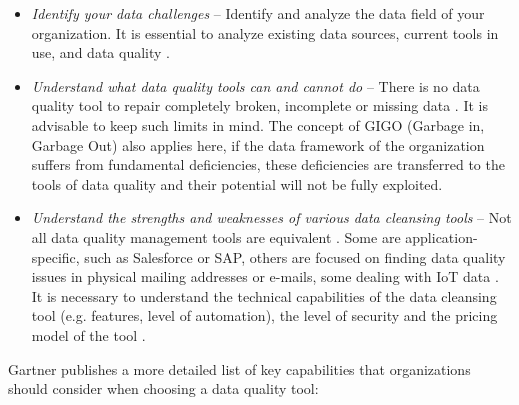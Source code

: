 			\begin{itemize}
				\item \textit{Identify your data challenges} -- Identify and analyze the data field of your organization. It is essential to analyze existing data sources, current tools in use, and data quality \cite{Greengard2019}.
				\item \textit{Understand what data quality tools can and cannot do} -- There is no data quality tool to repair completely broken, incomplete or missing data \cite{Greengard2019}. It is advisable to keep such limits in mind. The concept of GIGO (Garbage in, Garbage Out) also applies here, if the data framework of the organization suffers from fundamental deficiencies, these deficiencies are transferred to the tools of data quality and their potential will not be fully exploited.
				\item \textit{Understand the strengths and weaknesses of various data cleansing tools} -- Not all data quality management tools are equivalent \cite{Greengard2019}. Some are application-specific, such as Salesforce or SAP, others are focused on finding data quality issues in physical mailing addresses or e-mails, some dealing with IoT data \cite{Greengard2019}. It is necessary to understand the technical capabilities of the data cleansing tool (e.g. features, level of automation), the level of security and the pricing model of the tool \cite{Greengard2019}.
			\end{itemize}
	
				
    		Gartner publishes a more detailed list of key capabilities that organizations should consider when choosing a data quality tool:
    		 
